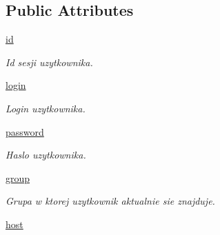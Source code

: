 \subsection*{Public Attributes}
\begin{CompactItemize}
\item 
\hypertarget{class_serv_1_1_user_1_1_user_9ccda7549874ecd0e505e47ab9f7e2f7}{
\hyperlink{class_serv_1_1_user_1_1_user_9ccda7549874ecd0e505e47ab9f7e2f7}{id}}
\label{class_serv_1_1_user_1_1_user_9ccda7549874ecd0e505e47ab9f7e2f7}

\begin{CompactList}\small\item\em Id sesji uzytkownika. \item\end{CompactList}\item 
\hypertarget{class_serv_1_1_user_1_1_user_26c268efd71044c8d201de3f2cc75ae1}{
\hyperlink{class_serv_1_1_user_1_1_user_26c268efd71044c8d201de3f2cc75ae1}{login}}
\label{class_serv_1_1_user_1_1_user_26c268efd71044c8d201de3f2cc75ae1}

\begin{CompactList}\small\item\em Login uzytkownika. \item\end{CompactList}\item 
\hypertarget{class_serv_1_1_user_1_1_user_ee1a7e306077b5c7b94746c088fd6807}{
\hyperlink{class_serv_1_1_user_1_1_user_ee1a7e306077b5c7b94746c088fd6807}{password}}
\label{class_serv_1_1_user_1_1_user_ee1a7e306077b5c7b94746c088fd6807}

\begin{CompactList}\small\item\em Haslo uzytkownika. \item\end{CompactList}\item 
\hypertarget{class_serv_1_1_user_1_1_user_244ae8ec25ad4fd34379c275a3f71267}{
\hyperlink{class_serv_1_1_user_1_1_user_244ae8ec25ad4fd34379c275a3f71267}{group}}
\label{class_serv_1_1_user_1_1_user_244ae8ec25ad4fd34379c275a3f71267}

\begin{CompactList}\small\item\em Grupa w ktorej uzytkownik aktualnie sie znajduje. \item\end{CompactList}\item 
\hypertarget{class_serv_1_1_user_1_1_user_b8dc612b892abb8d84cd2149cc3c5f3c}{
\hyperlink{class_serv_1_1_user_1_1_user_b8dc612b892abb8d84cd2149cc3c5f3c}{host}}
\label{class_serv_1_1_user_1_1_user_b8dc612b892abb8d84cd2149cc3c5f3c}


\end{CompactItemize}

